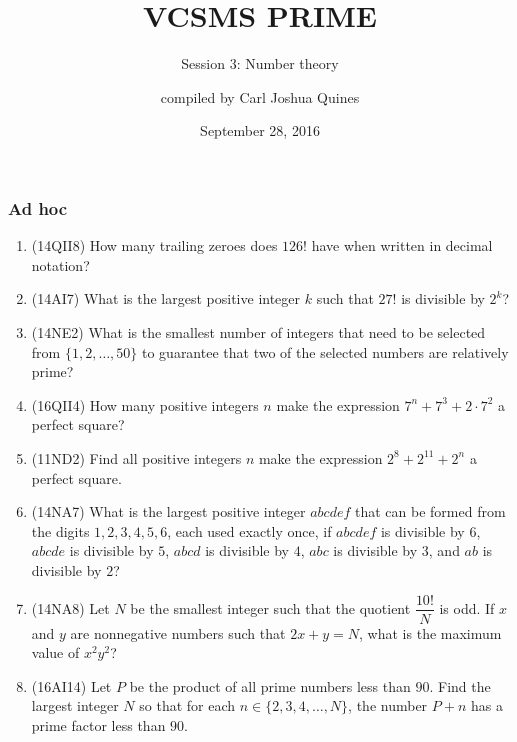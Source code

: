 \documentclass[10pt,paper=letter]{scrartcl}
\begin{document}
\title{VCSMS PRIME}
\subtitle{Session 3: Number theory}
\author{compiled by Carl Joshua Quines}
\date{September 28, 2016}

\maketitle

\subsubsection*{Ad hoc}

\begin{enumerate}

\item (14QII8) How many trailing zeroes does $126!$ have when written in decimal notation?

\item (14AI7) What is the largest positive integer $k$ such that $27!$ is divisible by $2^k$?

\item (14NE2) What is the smallest number of integers that need to be selected from $\{1,2,\ldots,50\}$ to guarantee that two of the selected numbers are relatively prime?

\item (16QII4) How many positive integers $n$ make the expression $7^n + 7^3 + 2 \cdot 7^2$ a perfect square?

\item (11ND2) Find all positive integers $n$ make the expression $2^8 + 2^{11} + 2^n$ a perfect square.

\item (14NA7) What is the largest positive integer $abcdef$ that can be formed from the digits $1,2,3,4,5,6$, each used exactly once, if $abcdef$ is divisible by $6$, $abcde$ is divisible by $5$, $abcd$ is divisible by $4$, $abc$ is divisible by $3$, and $ab$ is divisible by $2$?

\item (14NA8) Let $N$ be the smallest integer such that the quotient $\dfrac{10!}{N}$ is odd. If $x$ and $y$ are nonnegative numbers such that $2x+y=N$, what is the maximum value of $x^2y^2$?

\item (16AI14) Let $P$ be the product of all prime numbers less than $90$. Find the largest integer $N$ so that for each $n \in \{2, 3, 4, \ldots, N\}$, the number $P+n$ has a prime factor less than $90$.

\end{enumerate}
\end{document}

